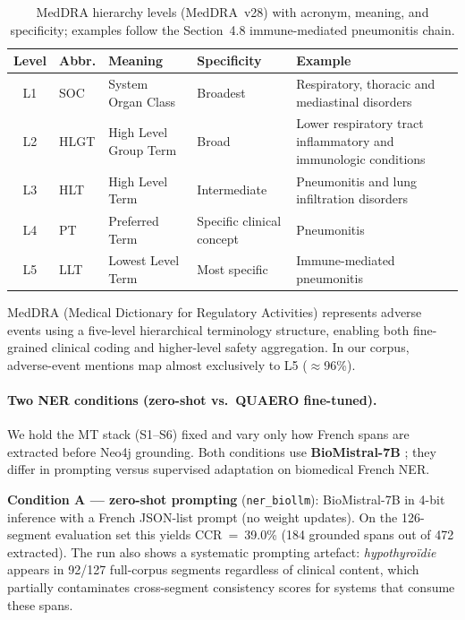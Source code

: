 \documentclass[11pt,a4paper,twocolumn]{article}
\renewcommand{\arraystretch}{1.1}
\begin{document}
\begin{table}[t]
\centering
\footnotesize
\setlength{\tabcolsep}{5pt}
\renewcommand{\arraystretch}{1.15}
\caption{MedDRA hierarchy levels (MedDRA~v28) with acronym, meaning, and
specificity; examples follow the Section~4.8 immune-mediated pneumonitis chain.}
\label{tab:meddra}
\begin{tabularx}{\textwidth}{@{}c l
  >{\raggedright\arraybackslash{}\hsize}Y
  >{\raggedright\arraybackslash{}\hsize}Y
  >{\raggedright\arraybackslash{}\hsize}Y@{}}
\toprule
\textbf{Level} & \textbf{Abbr.} & \textbf{Meaning} & \textbf{Specificity} & \textbf{Example} \\
\midrule
L1 & SOC  & System Organ Class    & Broadest                  & Respiratory, thoracic and mediastinal disorders \\
L2 & HLGT & High Level Group Term & Broad                     & Lower respiratory tract inflammatory and immunologic conditions \\
L3 & HLT  & High Level Term       & Intermediate              & Pneumonitis and lung infiltration disorders \\
L4 & PT   & Preferred Term        & Specific clinical concept & Pneumonitis \\
L5 & LLT  & Lowest Level Term     & Most specific             & Immune-mediated pneumonitis \\
\bottomrule
\end{tabularx}
\end{table}

\noindent
MedDRA (Medical Dictionary for Regulatory Activities) represents adverse events
using a five-level hierarchical terminology structure, enabling both
fine-grained clinical coding and higher-level safety aggregation. In our
corpus, adverse-event mentions map almost exclusively to L5 ($\approx$96\%).

\paragraph{Two NER conditions (zero-shot vs.\ QUAERO fine-tuned).}
\label{sec:ner_conditions}
We hold the MT stack (S1--S6) fixed and vary only how French spans are
extracted before Neo4j grounding. Both conditions use \textbf{BioMistral-7B}
\citep{labrak2024biomistral}; they differ in prompting versus supervised
adaptation on biomedical French NER.

\textbf{Condition A --- zero-shot prompting} (\texttt{ner\_biollm}):
BioMistral-7B in 4-bit inference with a French JSON-list prompt (no weight
updates). On the 126-segment evaluation set this yields CCR~=~39.0\% (184
grounded spans out of 472 extracted). The run also shows a systematic
prompting artefact: \textit{hypothyro\"{i}die} appears in 92/127 full-corpus
segments regardless of clinical content, which partially contaminates
cross-segment consistency scores for systems that consume these spans.
\end{document}
